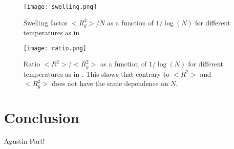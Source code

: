 \documentclass[aps,prl,reprint,groupedaddress]{revtex4-1}
\begin{document}
\begin{figure}[ht]
	\texttt{[image: swelling.png]}
	\caption{Swelling factor $<R_g^2>/N$ as a function of $1/\log(N)$ for different temperatures as in \cite{Grassberger1997} \label{swell}}
\end{figure}

\begin{figure}[ht]
	\texttt{[image: ratio.png]}
	\caption{Ratio $<R^2>/<R_g^2>$ as a function of $1/\log(N)$ for different temperatures as in \cite{Grassberger1997}. This shows that contrary to \cite{Smith1975} $<R^2>$ and $<R_g^2>$ does not have the same dependence on $N$. \label{ratio}}
\end{figure}

\section{Conclusion \label{conclusion}}
Agustin Part!


\end{document}
